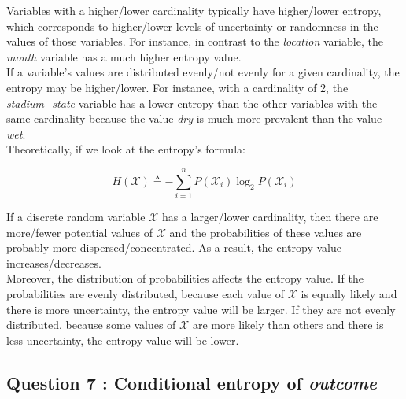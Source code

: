 \documentclass[titlepage]{article}
\begin{document}
Variables with a higher/lower cardinality typically have higher/lower entropy, which corresponds to higher/lower levels of uncertainty or randomness in the values of those variables. For instance, in contrast to the \textit{location} variable, the \textit{month} variable has a much higher entropy value.\\

If a variable's values are distributed evenly/not evenly for a given cardinality, the entropy may be higher/lower. For instance, with a cardinality of 2, the \textit{stadium\_state} variable has a lower entropy than the other variables with the same cardinality because the value \textit{dry} is much more prevalent than the value \textit{wet}. \\

Theoretically, if we look at the entropy's formula:

$$H(\mathcal{X}) \triangleq-\sum_{i=1}^n P\left(\mathcal{X}_i\right) \log_2 P\left(\mathcal{X}_i\right)$$

If a discrete random variable $\mathcal{X}$ has a larger/lower cardinality, then there are more/fewer potential values of $\mathcal{X}$ and the probabilities of these values are probably more dispersed/concentrated. As a result, the entropy value increases/decreases. \\

Moreover, the distribution of probabilities affects the entropy value.  If the probabilities are evenly distributed, because each value of  $\mathcal{X}$ is equally likely and there is more uncertainty, the entropy value will be larger. If they are not evenly distributed, because some values of $\mathcal{X}$ are more likely than others and there is less uncertainty, the entropy value will be lower.

\subsection*{Question 7 : Conditional entropy of \textit{outcome}}
\end{document}
